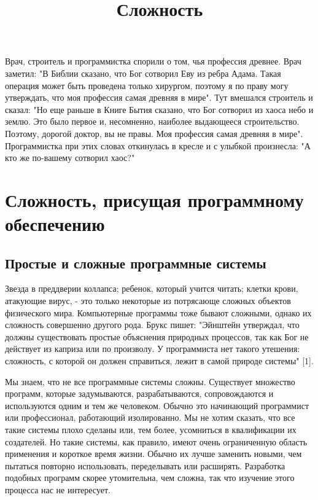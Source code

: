\documentclass[11pt]{article}
\title{\bf Сложность}
\author{}
\date{}
\begin{document}
\maketitle

\begin{flushright}
\begin{minipage}{0.5\hsize}
\small
Врач, строитель и программистка спорили о том, чья профессия древнее. Врач заметил: "В Библии сказано, что Бог сотворил Еву из ребра Адама. Такая операция может быть проведена только хирургом, поэтому я по праву могу утверждать, что моя профессия самая древняя в мире". Тут вмешался строитель и сказал: "Но еще раньше в Книге Бытия сказано, что Бог сотворил из хаоса небо и землю. Это было первое и, несомненно, наиболее выдающееся строительство. Поэтому, дорогой доктор, вы не правы. Моя профессия самая древняя в мире". Программистка при этих словах откинулась в кресле и с улыбкой произнесла: "А кто же по-вашему сотворил хаос?"

\end{minipage}
\end{flushright}

\section{Сложность, присущая программному обеспечению }
\subsection{Простые и сложные программные системы }
Звезда в преддверии коллапса; ребенок, который учится читать; клетки крови, атакующие вирус, - это только некоторые из потрясающе сложных объектов физического мира. Компьютерные программы тоже бывают сложными, однако их сложность совершенно другого рода. Брукс пишет: "Эйнштейн утверждал, что должны существовать простые объяснения природных процессов, так как Бог не действует из каприза или по произволу. У программиста нет такого утешения: сложность, с которой он должен справиться, лежит в самой природе системы" [1].\bigskip

Мы знаем, что не все программные системы сложны. Существует множество программ, которые задумываются, разрабатываются, сопровождаются и используются одним и тем же человеком. Обычно это начинающий программист или профессионал, работающий изолированно. Мы не хотим сказать, что все такие системы плохо сделаны или, тем более, усомниться в квалификации их создателей. Но такие системы, как правило, имеют очень ограниченную область применения и короткое время жизни. Обычно их лучше заменить новыми, чем пытаться повторно использовать, переделывать или расширять. Разработка подобных программ скорее утомительна, чем сложна, так что изучение этого процесса нас не интересует. \bigskip
\end{document}
